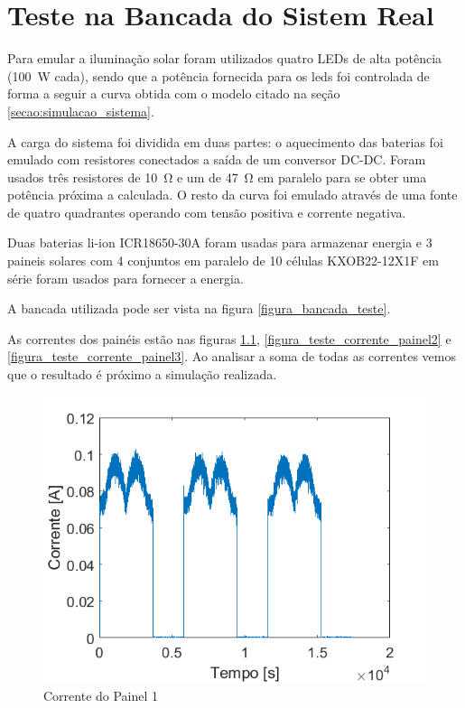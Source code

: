 \chapter{Teste na Bancada do Sistem Real} \label{secao:teste_sistema}

Para emular a iluminação solar foram utilizados quatro LEDs de alta potência (\SI{100}{\watt} cada), sendo que a potência fornecida para os leds foi controlada de forma a seguir a curva obtida com o modelo citado na seção \ref{secao:simulacao_sistema}.

A carga do sistema foi dividida em duas partes: o aquecimento das baterias foi emulado com resistores conectados a saída de um conversor DC-DC. Foram usados três resistores de \SI{10}{\ohm} e um de \SI{47}{\ohm} em paralelo para se obter uma potência próxima a calculada. O resto da curva foi emulado através de uma fonte de quatro quadrantes operando com tensão positiva e corrente negativa.

Duas baterias li-ion ICR18650-30A foram usadas para armazenar energia e 3 paineis solares com 4 conjuntos em paralelo de 10 células KXOB22-12X1F em série foram usados para fornecer a energia.

A bancada utilizada pode ser vista na figura \ref{figura_bancada_teste}.

As correntes dos painéis estão nas figuras \ref{figura_teste_corrente_painel1}, \ref{figura_teste_corrente_painel2} e \ref{figura_teste_corrente_painel3}. Ao analisar a soma de todas as correntes vemos que o resultado é próximo a simulação realizada.

\begin{figure}[!htpb]
\begin{center}
\includegraphics[scale=0.5]{figures/testPanel1Current.png}
\caption{Corrente do Painel 1}
\label{figura_teste_corrente_painel1}
\end{center}
\end{figure}

